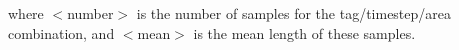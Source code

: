 \documentclass [a4paper, 10pt]{book}
\begin{document}
where $<$number$>$ is the number of samples for the tag/timestep/area combination, and $<$mean$>$ is the mean length of these samples.






\end{document}

